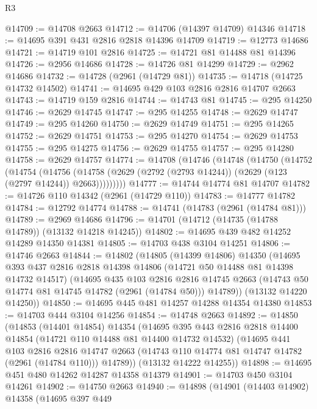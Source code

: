 \begin{lexlean}{R3}
\begin{coremodule}
@14709 := @14708 @2663
@14712 := @14706 (@14397 @14709) @14346
@14718 := @14695 @391 @431 @2816 @2818 @14396 @14709
@14719 := @12773 @14686
@14721 := @14719 @101 @2816
@14725 := @14721 @81 @14488 @81 @14396
@14726 := @2956 @14686
@14728 := @14726 @81 @14299
@14729 := @2962 @14686
@14732 := @14728 (@2961 (@14729 @81))
@14735 := @14718 (@14725 @14732 @14502)
@14741 := @14695 @429 @103 @2816 @2816 @14707 @2663
@14743 := @14719 @159 @2816
@14744 := @14743 @81
@14745 := @295 @14250
@14746 := @2629 @14745
@14747 := @295 @14255
@14748 := @2629 @14747
@14749 := @295 @14260
@14750 := @2629 @14749
@14751 := @295 @14265
@14752 := @2629 @14751
@14753 := @295 @14270
@14754 := @2629 @14753
@14755 := @295 @14275
@14756 := @2629 @14755
@14757 := @295 @14280
@14758 := @2629 @14757
@14774 := @14708
    (@14746
      (@14748
        (@14750
          (@14752
            (@14754
              (@14756
                (@14758 (@2629 (@2792 (@2793 @14244)) (@2629 (@123 (@2797 @14244)) @2663)))))))))
@14777 := @14744 @14774 @81 @14707
@14782 := @14726 @110 @14342 (@2961 (@14729 @110))
@14783 := @14777 @14782
@14784 := @12792 @14774
@14788 := @14741 (@14783 (@2961 (@14784 @81)))
@14789 := @2969 @14686
@14796 := @14701 (@14712 (@14735 (@14788 @14789)) (@13132 @14218 @14245))
@14802 := @14695 @439 @482 @14252 @14289 @14350 @14381
@14805 := @14703 @438 @3104 @14251
@14806 := @14746 @2663
@14844 := @14802
    (@14805
      (@14399 @14806)
      @14350
      (@14695
        @393
        @437
        @2816
        @2818
        @14398
        @14806
        (@14721 @50 @14488 @81 @14398 @14732 @14517)
        (@14695
          @435
          @103
          @2816
          @2816
          @14745
          @2663
          (@14743 @50 @14774 @81 @14745 @14782 (@2961 (@14784 @50)))
          @14789))
      (@13132 @14220 @14250))
@14850 := @14695 @445 @481 @14257 @14288 @14354 @14380
@14853 := @14703 @444 @3104 @14256
@14854 := @14748 @2663
@14892 := @14850
    (@14853
      (@14401 @14854)
      @14354
      (@14695
        @395
        @443
        @2816
        @2818
        @14400
        @14854
        (@14721 @110 @14488 @81 @14400 @14732 @14532)
        (@14695
          @441
          @103
          @2816
          @2816
          @14747
          @2663
          (@14743 @110 @14774 @81 @14747 @14782 (@2961 (@14784 @110)))
          @14789))
      (@13132 @14222 @14255))
@14898 := @14695 @451 @480 @14262 @14287 @14358 @14379
@14901 := @14703 @450 @3104 @14261
@14902 := @14750 @2663
@14940 := @14898
    (@14901
      (@14403 @14902)
      @14358
      (@14695
        @397
        @449

\end{coremodule}
\end{lexlean}
